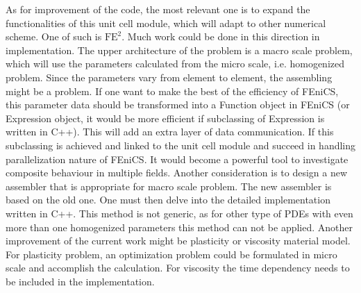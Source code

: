 As for improvement of the code, the most relevant one is to expand the functionalities of this unit cell module, which will adapt to other numerical scheme. One of such is $\text{FE}^{2}$. Much work could be done in this direction in implementation. The upper architecture of the problem is a macro scale problem, which will use the parameters calculated from the micro scale, i.e. homogenized problem. Since the parameters vary from element to element, the assembling might be a problem. If one want to make the best of the efficiency of FEniCS, this parameter data should be transformed into a Function object in FEniCS (or Expression object, it would be more efficient if subclassing of Expression is written in C++). This will add an extra layer of data communication. If this subclassing is achieved and linked to the unit cell module and succeed in handling parallelization nature of FEniCS. It would become a powerful tool to investigate composite behaviour in multiple fields. Another consideration is to design a new assembler that is appropriate for macro scale problem. The new assembler is based on the old one. One must then delve into the detailed implementation written in C++. This method is not generic, as for other type of PDEs with even more than one homogenized parameters this method can not be applied. Another improvement of the current work might be plasticity or viscosity material model. For plasticity problem, an optimization problem could be formulated in micro scale and accomplish the calculation. For viscosity the time dependency needs to be included in the implementation.

%
%
